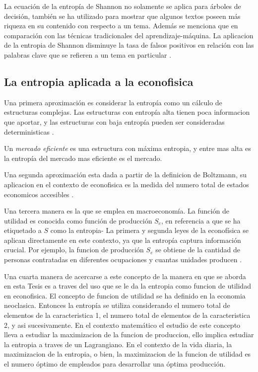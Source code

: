La ecuación de la entropía de Shannon no solamente se aplica para árboles de decisión, también se ha utilizado para mostrar que algunos textos poseen más riqueza en su contenido con respecto a un tema. 
Además se menciona que en comparación con las técnicas tradicionales del aprendizaje-máquina.
La aplicacion de la entropia de Shannon disminuye la tasa de falsos positivos en relación con las palabras clave que se refieren a un tema en particular \citep[][]{chan2022knowledge}.   
 
\subsection{La entropia aplicada a la econofisica}

Una primera aproximación es considerar la entropía como un cálculo de estructuras complejas. Las estructuras con entropía alta tienen poca informacion que aportar, y las estructuras con baja entropía pueden ser consideradas deterministicas \citep[][]{pincus2004irregularity}.

Un \textit{mercado eficiente} es una estructura con máxima entropia, y entre mas alta es la entropía del mercado mas eficiente es el mercado.

Una segunda aproximación esta dada a partir de la definicion de Boltzmann, su aplicacion en el contexto de econofisica es la medida del numero total de estados economicos accesibles \citep[][]{richmond}.

Una tercera manera es la que se emplea en macroeconomía. La función de utilidad es conocida como función de producción $S_e$, en referencia a que se ha etiquetado a $S$ como la entropia- La primera y segunda leyes de la econofísica se aplican directamente en este contexto, ya que la entropía captura información crucial. Por ejemplo, la funcion de producción $S_e$ se obtiene de la cantidad de personas contratadas en diferentes ocupaciones y cuantas unidades producen \citep[][pagina 170]{richmond}. 

Una cuarta manera de acercarse a este concepto de la manera en que se aborda en esta Tesis es a traves del uso que se le da la entropia como funcion de utilidad en econofisica. El concepto de funcion de utilidad se ha definido en la economia neoclasica. Entonces la entropía se utiliza considerando el numero total de elementos de la caracteristica 1, el numero total de elementos de la caracteristica 2, y asi sucesivamente. En el contexto matemático el estudio de este concepto lleva a estudiar la maximizacion de la funcion de produccion, ello implica estudiar la entropia a traves de un Lagrangiano. En el contexto de la vida diaria, la maximizacion  de la entropia, o bien, la maximizacion de la funcion de utilidad es el numero óptimo de empleados para desarrollar una óptima producción.

